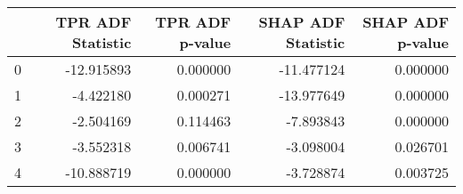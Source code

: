 \begin{tabular}{lrrrr}
\toprule
 & TPR ADF Statistic & TPR ADF p-value & SHAP ADF Statistic & SHAP ADF p-value \\
\midrule
0 & -12.915893 & 0.000000 & -11.477124 & 0.000000 \\
1 & -4.422180 & 0.000271 & -13.977649 & 0.000000 \\
2 & -2.504169 & 0.114463 & -7.893843 & 0.000000 \\
3 & -3.552318 & 0.006741 & -3.098004 & 0.026701 \\
4 & -10.888719 & 0.000000 & -3.728874 & 0.003725 \\
\bottomrule
\end{tabular}
